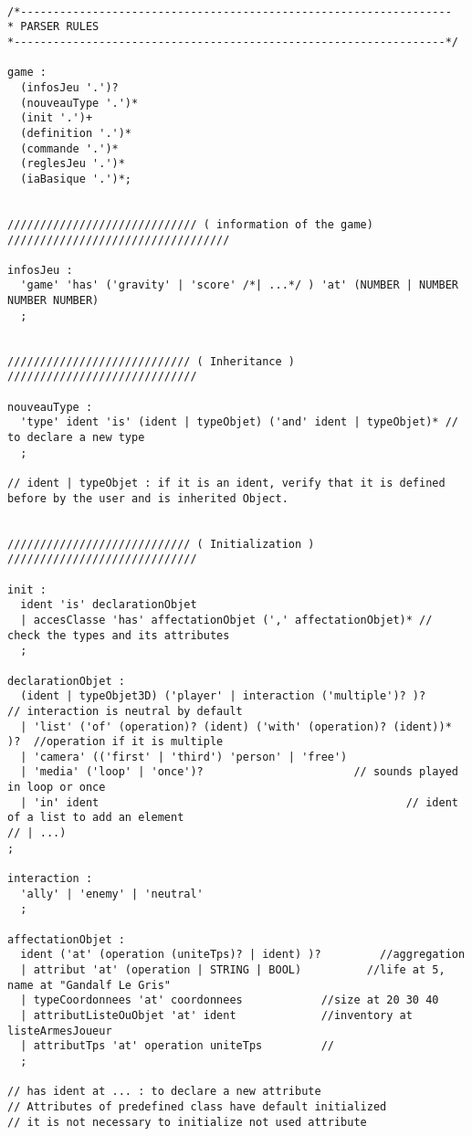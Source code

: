\begin{lstlisting}[language=GameGrammar]

/*------------------------------------------------------------------
* PARSER RULES
*------------------------------------------------------------------*/
 
game :
  (infosJeu '.')?
  (nouveauType '.')*
  (init '.')+
  (definition '.')*
  (commande '.')*
  (reglesJeu '.')*
  (iaBasique '.')*;
 

///////////////////////////// ( information of the game)  //////////////////////////////////

infosJeu :
  'game' 'has' ('gravity' | 'score' /*| ...*/ ) 'at' (NUMBER | NUMBER NUMBER NUMBER)
  ;

 
//////////////////////////// ( Inheritance )  /////////////////////////////
 
nouveauType :
  'type' ident 'is' (ident | typeObjet) ('and' ident | typeObjet)* // to declare a new type
  ;            
  
// ident | typeObjet : if it is an ident, verify that it is defined before by the user and is inherited Object.

 
//////////////////////////// ( Initialization )  /////////////////////////////

init :
  ident 'is' declarationObjet
  | accesClasse 'has' affectationObjet (',' affectationObjet)* // check the types and its attributes
  ;
 
declarationObjet :
  (ident | typeObjet3D) ('player' | interaction ('multiple')? )?         // interaction is neutral by default
  | 'list' ('of' (operation)? (ident) ('with' (operation)? (ident))* )?  //operation if it is multiple 
  | 'camera' (('first' | 'third') 'person' | 'free')
  | 'media' ('loop' | 'once')? 						 // sounds played in loop or once
  | 'in' ident 				                                 // ident of a list to add an element
// | ...)
;           
 
interaction :
  'ally' | 'enemy' | 'neutral'
  ;
 
affectationObjet :
  ident ('at' (operation (uniteTps)? | ident) )?         //aggregation
  | attribut 'at' (operation | STRING | BOOL)          //life at 5, name at "Gandalf Le Gris"
  | typeCoordonnees 'at' coordonnees            //size at 20 30 40
  | attributListeOuObjet 'at' ident             //inventory at listeArmesJoueur
  | attributTps 'at' operation uniteTps         //
  ;
 
// has ident at ... : to declare a new attribute
// Attributes of predefined class have default initialized
// it is not necessary to initialize not used attribute
  

\end{lstlisting}
